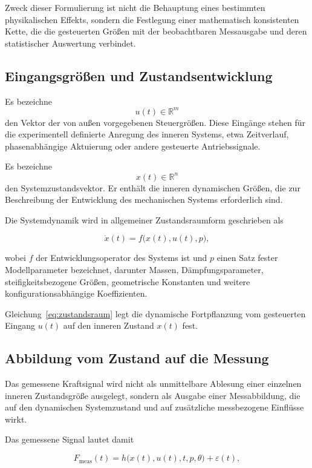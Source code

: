 \documentclass[12pt,a4paper]{report}
\begin{document}
Zweck dieser Formulierung ist nicht die Behauptung eines bestimmten
physikalischen Effekts, sondern die Festlegung einer mathematisch
konsistenten Kette, die die gesteuerten Größen mit der beobachtbaren
Messausgabe und deren statistischer Auswertung verbindet.

\subsection{Eingangsgrößen und Zustandsentwicklung}

Es bezeichne
\[
u(t) \in \mathbb{R}^{m}
\]
den Vektor der von außen vorgegebenen Steuergrößen. Diese Eingänge stehen
für die experimentell definierte Anregung des inneren Systems, etwa
Zeitverlauf, phasenabhängige Aktuierung oder andere gesteuerte
Antriebssignale.

Es bezeichne
\[
x(t) \in \mathbb{R}^{n}
\]
den Systemzustandsvektor. Er enthält die inneren dynamischen Größen, die
zur Beschreibung der Entwicklung des mechanischen Systems erforderlich
sind.

Die Systemdynamik wird in allgemeiner Zustandsraumform geschrieben als

\begin{equation}
\dot{x}(t) = f\bigl(x(t),u(t),p\bigr),
\label{eq:zustandsraum}
\end{equation}

wobei $f$ der Entwicklungsoperator des Systems ist und $p$ einen Satz
fester Modellparameter bezeichnet, darunter Massen, Dämpfungsparameter,
steifigkeitsbezogene Größen, geometrische Konstanten und weitere
konfigurationsabhängige Koeffizienten.

Gleichung~\eqref{eq:zustandsraum} legt die dynamische Fortpflanzung vom
gesteuerten Eingang $u(t)$ auf den inneren Zustand $x(t)$ fest.

\subsection{Abbildung vom Zustand auf die Messung}

Das gemessene Kraftsignal wird nicht als unmittelbare Ablesung einer
einzelnen inneren Zustandsgröße ausgelegt, sondern als Ausgabe einer
Messabbildung, die auf den dynamischen Systemzustand und auf zusätzliche
messbezogene Einflüsse wirkt.

Das gemessene Signal lautet damit

\begin{equation}
F_{\mathrm{meas}}(t) = h\bigl(x(t),u(t),t,p,\theta\bigr) + \varepsilon(t),
\label{eq:messabbildung}
\end{equation}
\end{document}
